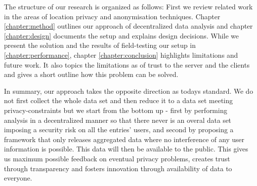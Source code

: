 The structure of our research is organized as follows: First we review related work in the areas of location privacy and anonymisation techniques.
Chapter \ref{chapter:method} outlines our approach of decentralized data analysis and chapter \ref{chapter:design} documents the setup and explains design decisions. While we present the solution and the results of field-testing our setup in \ref{chapter:performance}, chapter \ref{chapter:conclusion} highlights limitations and future work. It also topics the limitations as of trust to the server and the clients and gives a short outline how this problem can be solved.

In summary, our approach takes the opposite direction as todays standard. We do not first collect the whole data set and then reduce it to a data set meeting privacy-constraints but we start from the bottom up - first by performing analysis in a decentralized manner so that there never is an overal data set imposing a security risk on all the entries' users, and second by proposing a framework that only releases aggregated data where no interference of any user information is possible. This data will then be available to the public. This gives us maximum possible feedback on eventual privacy problems, creates trust through transparency and fosters innovation through availability of data to everyone.







